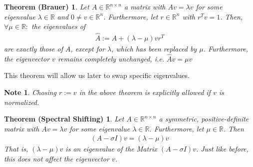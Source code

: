\documentclass[10pt, a4paper, twocolumn]{article} %
\begin{document}
    \newtheorem{Brauer}[]{Theorem (Brauer)}[section]
    \begin{Brauer}
        Let $A \in \mathbb{R}^{n \times n}$ a matrix with $Av=\lambda v$ for some eigenvalue $\lambda \in \mathbb{R}$ and $0 \neq v \in \mathbb{R}^n$.
        Furthermore, let $r \in \mathbb{R}^n$ with $r^{T}v=1$. Then, $\forall \mu \in \mathbb{R}:$ the eigenvalues of
        \begin{align}
            \hat{A} := A + (\lambda - \mu)vr^T
        \end{align}
        are exactly those of $A$, except for $\lambda$, which has been replaced by $\mu$. Furthermore, the eigenvector $v$ remains
        completely unchanged, i.e. $\hat{A}v = \mu v$
    \end{Brauer}
    This theorem will allow us later to swap specific eigenvalues.

    \newtheorem{Brauer Param Note}[]{Note}[section]
    \begin{Brauer Param Note}
        Chosing $r:=v$ in the above theorem is explicitly allowed if $v$ is normalized.
    \end{Brauer Param Note}

    \newtheorem{Spectral Shifting}[]{Theorem (Spectral Shifting)}[section]
    \begin{Spectral Shifting}
        Let $A \in \mathbb{R}^{n \times n}$ a symmetric, positive-definite matrix with $Av=\lambda v$ for some eigenvalue $\lambda \in \mathbb{R}$.
        Furthermore, let $\mu \in \mathbb{R}$. Then
        \begin{align}
            (A - \sigma I)v = (\lambda - \mu)v
        \end{align}
        That is, $(\lambda - \mu)v$ is an eigenvalue of the Matrix $(A - \sigma I)v$. Just like before, this does not affect the
        eigenvector $v$.
    \end{Spectral Shifting}
\end{document}
